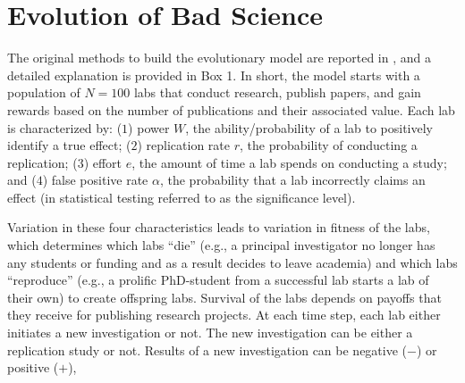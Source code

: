 \documentclass[meta, authordate]{jote-new-article}
\begin{document}
\section{Evolution of Bad Science}






The original methods to build the evolutionary model are reported in \textcite{SmaldinoMcelreath2016}, and a detailed explanation is provided in Box 1. In short, the model starts with a population of $N=100$ labs that conduct research, publish papers, and gain rewards based on the number of publications and their associated value. Each lab is characterized by: ($1$) power $W$, the ability/probability of a lab to positively identify a true effect; ($2$) replication rate $r$, the probability of conducting a replication; ($3$) effort $e$, the amount of time a lab spends on conducting a study; and ($4$) false positive rate $\alpha$, the probability that a lab incorrectly claims an effect (in statistical testing referred to as the significance level).


Variation in these four characteristics leads to variation in fitness of the labs, which determines which labs ``die'' (e.g., a principal investigator no longer has any students or funding and as a result decides to leave academia) and which labs ``reproduce'' (e.g., a prolific PhD-student from a successful lab starts a lab of their own) to create offspring labs. Survival of the labs depends on payoffs that they receive for publishing research projects. At each time step, each lab either initiates a new investigation or not. The new investigation can be either a replication study or not. Results of a new investigation can be negative ($-$) or positive ($+$),\newpage
\end{document}
